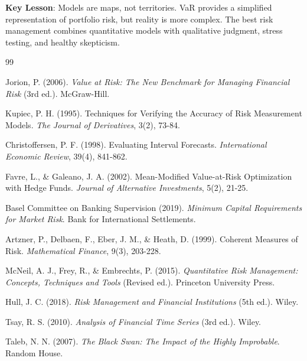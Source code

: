 \documentclass[12pt,a4paper]{article}
\begin{document}
\textbf{Key Lesson}: Models are maps, not territories. VaR provides a simplified representation of portfolio risk, but reality is more complex. The best risk management combines quantitative models with qualitative judgment, stress testing, and healthy skepticism.

\newpage
\begin{thebibliography}{99}

Jorion, P. (2006). \textit{Value at Risk: The New Benchmark for Managing Financial Risk} (3rd ed.). McGraw-Hill.

Kupiec, P. H. (1995). Techniques for Verifying the Accuracy of Risk Measurement Models. \textit{The Journal of Derivatives}, 3(2), 73-84.

Christoffersen, P. F. (1998). Evaluating Interval Forecasts. \textit{International Economic Review}, 39(4), 841-862.

Favre, L., \& Galeano, J. A. (2002). Mean-Modified Value-at-Risk Optimization with Hedge Funds. \textit{Journal of Alternative Investments}, 5(2), 21-25.

Basel Committee on Banking Supervision (2019). \textit{Minimum Capital Requirements for Market Risk}. Bank for International Settlements.

Artzner, P., Delbaen, F., Eber, J. M., \& Heath, D. (1999). Coherent Measures of Risk. \textit{Mathematical Finance}, 9(3), 203-228.

McNeil, A. J., Frey, R., \& Embrechts, P. (2015). \textit{Quantitative Risk Management: Concepts, Techniques and Tools} (Revised ed.). Princeton University Press.

Hull, J. C. (2018). \textit{Risk Management and Financial Institutions} (5th ed.). Wiley.

Tsay, R. S. (2010). \textit{Analysis of Financial Time Series} (3rd ed.). Wiley.

Taleb, N. N. (2007). \textit{The Black Swan: The Impact of the Highly Improbable}. Random House.

\end{thebibliography}

\newpage
\appendix
\end{document}
